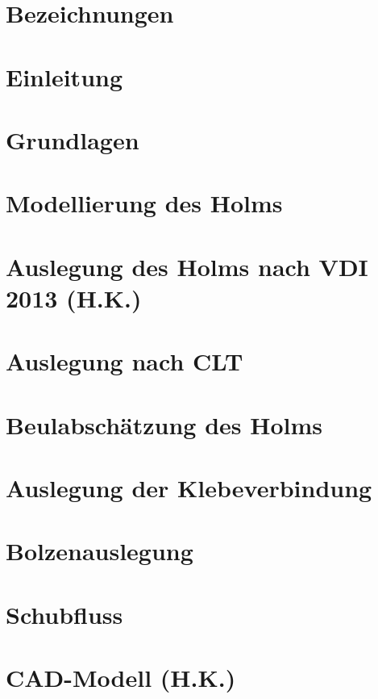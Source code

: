 \documentclass[a4paper,twoside,11pt]{article}
\begin{document}


\newpage

\newpage
\tableofcontents
\newpage
\section{Bezeichnungen}

\newpage
\section{Einleitung}

\newpage
\section{Grundlagen}

\newpage
\section{Modellierung des Holms}

\newpage
\section{Auslegung des Holms nach VDI 2013 (H.K.)}
\label{VDI2013}

\newpage
\section{Auslegung nach CLT}

\newpage
\section{Beulabschätzung des Holms}

\newpage
\section{Auslegung der Klebeverbindung}

\newpage
\section{Bolzenauslegung}

\newpage
\section{Schubfluss}

\newpage
\section{CAD-Modell (H.K.)}

\newpage
\end{document}
